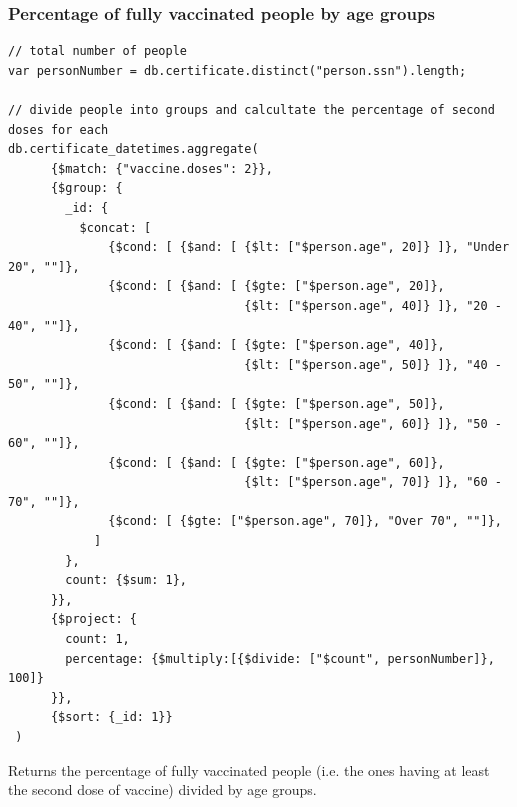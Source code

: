 \documentclass[12pt, a4paper]{article}
\begin{document}
\subsubsection{Percentage of fully vaccinated people by age groups}
\begin{tcolorbox}[fontupper=\scriptsize]
    \begin{verbatim}
// total number of people
var personNumber = db.certificate.distinct("person.ssn").length;

// divide people into groups and calcultate the percentage of second doses for each 
db.certificate_datetimes.aggregate(
      {$match: {"vaccine.doses": 2}},
      {$group: {
        _id: {
          $concat: [
              {$cond: [ {$and: [ {$lt: ["$person.age", 20]} ]}, "Under 20", ""]},
              {$cond: [ {$and: [ {$gte: ["$person.age", 20]}, 
                                 {$lt: ["$person.age", 40]} ]}, "20 - 40", ""]},
              {$cond: [ {$and: [ {$gte: ["$person.age", 40]}, 
                                 {$lt: ["$person.age", 50]} ]}, "40 - 50", ""]},
              {$cond: [ {$and: [ {$gte: ["$person.age", 50]}, 
                                 {$lt: ["$person.age", 60]} ]}, "50 - 60", ""]},
              {$cond: [ {$and: [ {$gte: ["$person.age", 60]}, 
                                 {$lt: ["$person.age", 70]} ]}, "60 - 70", ""]},
              {$cond: [ {$gte: ["$person.age", 70]}, "Over 70", ""]},
            ]
        },
        count: {$sum: 1},
      }},
      {$project: {
        count: 1,
        percentage: {$multiply:[{$divide: ["$count", personNumber]}, 100]}
      }},
      {$sort: {_id: 1}}
 )
    \end{verbatim}
\end{tcolorbox}
\noindent 
Returns the percentage of fully vaccinated people (i.e. the ones having at least the second dose of vaccine)
divided by age groups.
\end{document}

